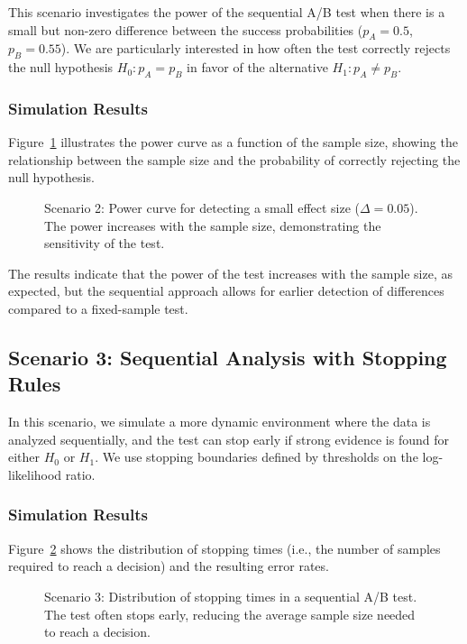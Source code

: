 \documentclass[magisterska, english]{pwr_wmat_praca_dyplomowa}
\theoremstyle{plain}
\numberwithin{theorem}{chapter}
\theoremstyle{definition}
\numberwithin{theorem}{chapter}
\begin{document}
This scenario investigates the power of the sequential A/B test when there is a small but non-zero difference between the success probabilities (\( p_A = 0.5 \), \( p_B = 0.55 \)). We are particularly interested in how often the test correctly rejects the null hypothesis \( H_0: p_A = p_B \) in favor of the alternative \( H_1: p_A \neq p_B \).

\subsubsection{Simulation Results}

Figure~\ref{fig:scenario2} illustrates the power curve as a function of the sample size, showing the relationship between the sample size and the probability of correctly rejecting the null hypothesis.

\begin{figure}[H]
	\centering
	\caption{Scenario 2: Power curve for detecting a small effect size (\( \Delta = 0.05 \)). The power increases with the sample size, demonstrating the sensitivity of the test.}
	\label{fig:scenario2}
\end{figure}

The results indicate that the power of the test increases with the sample size, as expected, but the sequential approach allows for earlier detection of differences compared to a fixed-sample test.

\subsection{Scenario 3: Sequential Analysis with Stopping Rules}

In this scenario, we simulate a more dynamic environment where the data is analyzed sequentially, and the test can stop early if strong evidence is found for either \( H_0 \) or \( H_1 \). We use stopping boundaries defined by thresholds on the log-likelihood ratio.

\subsubsection{Simulation Results}

Figure~\ref{fig:scenario3} shows the distribution of stopping times (i.e., the number of samples required to reach a decision) and the resulting error rates.

\begin{figure}[H]
	\centering
	\caption{Scenario 3: Distribution of stopping times in a sequential A/B test. The test often stops early, reducing the average sample size needed to reach a decision.}
	\label{fig:scenario3}
\end{figure}
\end{document}
